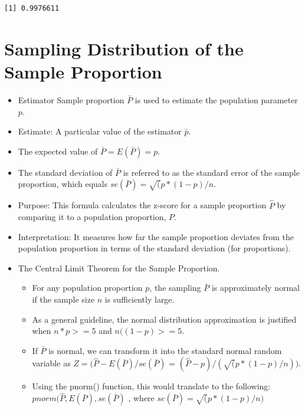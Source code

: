 \documentclass[
  letterpaper,
  DIV=11,
  numbers=noendperiod]{scrreprt}
\providecommand{\tightlist}{%
  \setlength{\itemsep}{0pt}\setlength{\parskip}{0pt}}\usepackage{longtable,booktabs,array}
\begin{document}
\begin{verbatim}
[1] 0.9976611
\end{verbatim}

\section{Sampling Distribution of the Sample
Proportion}\label{sampling-distribution-of-the-sample-proportion}

\begin{itemize}
\tightlist
\item
  Estimator Sample proportion \(\bar{P}\) is used to estimate the
  population parameter \(p\).
\item
  Estimate: A particular value of the estimator \(\bar{p}\).
\item
  The expected value of \(\bar{P}=E(\bar{P})=𝑝\).
\item
  The standard deviation of \(\bar{P}\) is referred to as the standard
  error of the sample proportion, which equals
  \(se(\bar{P}) = \sqrt(p*(1-p)/n\).
\item
  Purpose: This formula calculates the z-score for a sample proportion
  \(\hat{P}\) by comparing it to a population proportion, \(P\).
\item
  Interpretation: It measures how far the sample proportion deviates
  from the population proportion in terms of the standard deviation (for
  proportions).
\item
  The Central Limit Theorem for the Sample Proportion.

  \begin{itemize}
  \tightlist
  \item
    For any population proportion \(p\), the sampling \(\bar{P}\) is
    approximately normal if the sample size \(n\) is sufficiently large.
  \item
    As a general guideline, the normal distribution approximation is
    justified when \(n*p>=5\) and \(n((1-p)>=5\).
  \item
    If \(\bar{P}\) is normal, we can transform it into the standard
    normal random variable as \(Z=(\hat{P}-E(\bar{P})/se(\bar{P})\) =
    \((\hat{P}-p)/(\sqrt(p*(1-p)/n))\).
  \item
    Using the pnorm() function, this would translate to the following:
    \(pnorm(\hat{P}, E(\bar{P}), se(\bar{P})\) , where
    \(se(\bar{P}) = \sqrt(p*(1-p)/n)\)
  \end{itemize}
\end{itemize}
\end{document}
